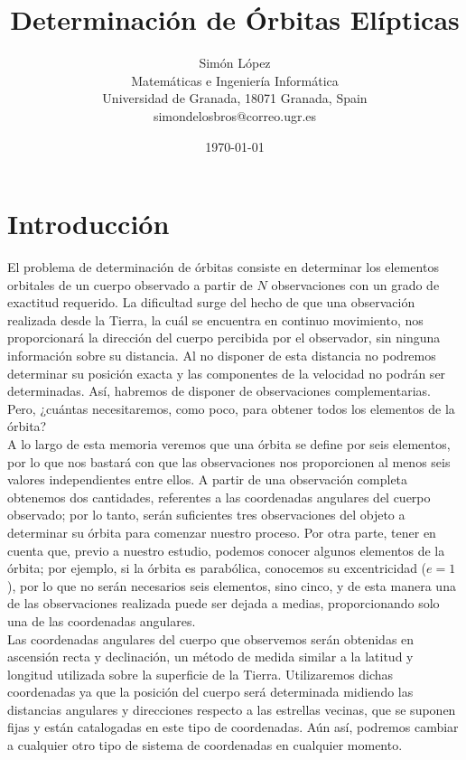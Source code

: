 \documentclass[11pt]{article}
\title{Determinación de Órbitas Elípticas}
\author{Simón López
\\
{\small Matemáticas e Ingeniería Informática}
\\
{\small Universidad de Granada, 18071 Granada, Spain}
\\
{\small simondelosbros@correo.ugr.es}}
\date{\today}
\begin{document}
\maketitle

\section{Introducción}
\label{sec:introduction}
El problema de determinación de órbitas consiste en determinar los elementos orbitales de un cuerpo observado a partir de $N$ observaciones con un grado de exactitud requerido. La dificultad surge del hecho de que una observación realizada desde la Tierra, la cuál se encuentra en continuo movimiento, nos proporcionará la dirección del cuerpo percibida por el observador, sin ninguna información sobre su distancia. Al no disponer de esta distancia no podremos determinar su posición exacta y las componentes de la velocidad no podrán ser determinadas. Así, habremos de disponer de observaciones complementarias. Pero, ¿cuántas necesitaremos, como poco, para obtener todos los elementos de la órbita?\\

A lo largo de esta memoria veremos que una órbita se define por seis elementos, por lo que nos bastará con que las observaciones nos proporcionen al menos seis valores independientes entre ellos. A partir de una observación completa obtenemos dos cantidades, referentes a las coordenadas angulares del cuerpo observado; por lo tanto, serán suficientes tres observaciones del objeto a determinar su órbita para comenzar nuestro proceso. Por otra parte, tener en cuenta que, previo a nuestro estudio, podemos conocer algunos elementos de la órbita; por ejemplo, si la órbita es parabólica, conocemos su excentricidad ($e=1$), por lo que no serán necesarios seis elementos, sino cinco, y de esta manera una de las observaciones realizada puede ser dejada a medias, proporcionando solo una de las coordenadas angulares.\\

Las coordenadas angulares del cuerpo que observemos serán obtenidas en ascensión recta y declinación, un método de medida similar a la latitud y longitud utilizada sobre la superficie de la Tierra. Utilizaremos dichas coordenadas ya que la posición del cuerpo será determinada midiendo las distancias angulares y direcciones respecto a las estrellas vecinas, que se suponen fijas y están catalogadas en este tipo de coordenadas. Aún así, podremos cambiar a cualquier otro tipo de sistema de coordenadas en cualquier momento.\\
\end{document}

